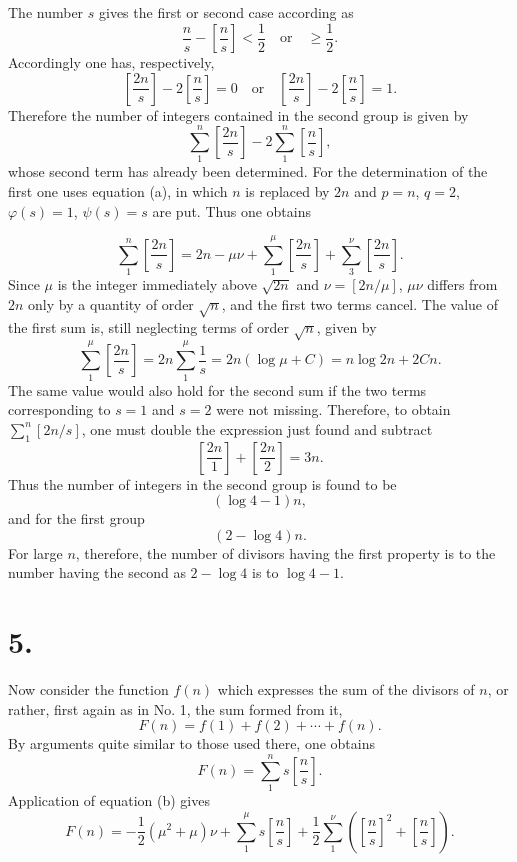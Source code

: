 \documentclass[11pt]{article}
\newcommand{\floor}[1]{\left[#1\right]}
\begin{document}
The number $s$ gives the first or second case according as
\[
 \frac ns-\floor{\frac ns}<\frac12\quad \text{or}\quad \geq\frac12.
\]
Accordingly one has, respectively,
\[
 \floor{\frac{2n}{s}}-2\floor{\frac ns}=0\quad \text{or}\quad
 \floor{\frac{2n}{s}}-2\floor{\frac ns}=1.
\]
Therefore the number of integers contained in the second group is given by
\[
 \sum_{1}^{n}\floor{\frac{2n}{s}}-2\sum_{1}^{n}\floor{\frac ns},
\]
whose second term has already been determined. For the determination of the first one uses equation (a), in which $n$ is replaced by $2n$ and $p=n$, $q=2$, $\varphi(s)=1$, $\psi(s)=s$ are put. Thus one obtains

\[
 \sum_{1}^{n}\floor{\frac{2n}{s}}=2n-\mu\nu+
 \sum_{1}^{\mu}\floor{\frac{2n}{s}}+
 \sum_{3}^{\nu}\floor{\frac{2n}{s}}.
\]
Since $\mu$ is the integer immediately above $\sqrt{2n}$ and $\nu=\floor{2n/\mu}$, $\mu\nu$ differs from $2n$ only by a quantity of order $\sqrt n$, and the first two terms cancel. The value of the first sum is, still neglecting terms of order $\sqrt n$, given by
\[
 \sum_{1}^{\mu}\floor{\frac{2n}{s}}=2n\sum_{1}^{\mu}\frac1s=2n(\log\mu+C)=n\log 2n+2Cn.
\]
The same value would also hold for the second sum if the two terms corresponding to $s=1$ and $s=2$ were not missing. Therefore, to obtain $\sum_1^n\floor{2n/s}$, one must double the expression just found and subtract
\[
 \floor{\frac{2n}{1}}+\floor{\frac{2n}{2}}=3n.
\]
Thus the number of integers in the second group is found to be
\[
 (\log4-1)n,
\]
and for the first group
\[
 (2-\log4)n.
\]
For large $n$, therefore, the number of divisors having the first property is to the number having the second as $2-\log4$ is to $\log4-1$.

\section*{5.}

Now consider the function $f(n)$ which expresses the sum of the divisors of $n$, or rather, first again as in No. 1, the sum formed from it,
\[
 F(n)=f(1)+f(2)+\cdots+f(n).
\]
By arguments quite similar to those used there, one obtains
\[
 F(n)=\sum_{1}^{n}s\floor{\frac ns}.
\]
Application of equation (b) gives
\[
 F(n)=-\frac12(\mu^2+\mu)\nu+
 \sum_{1}^{\mu}s\floor{\frac ns}+\frac12\sum_{1}^{\nu}\left(\floor{\frac ns}^{2}+\floor{\frac ns}\right).
\]
\end{document}
